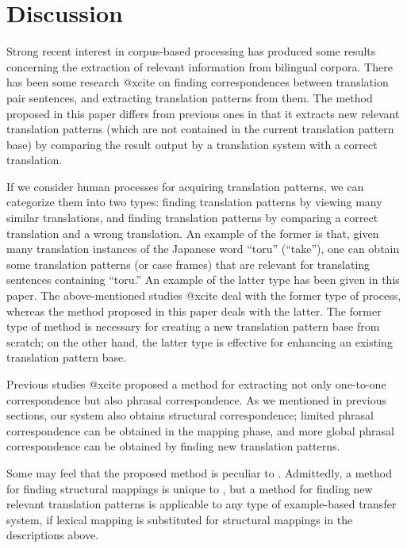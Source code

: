 \section{Discussion}


Strong recent interest in corpus-based processing has produced some results
concerning the extraction of relevant information from bilingual corpora. 
There has been some research
@xcite on finding
correspondences between translation pair sentences, and extracting translation
patterns from them.  The method proposed in this paper differs from previous
ones in that it extracts new relevant translation patterns (which are not
contained in the current translation pattern base) by comparing the result
output by a translation system with a correct translation.

If we consider human processes for acquiring translation patterns, we can
categorize them into two types: finding translation patterns by viewing many
similar translations, and finding translation patterns by comparing a correct
translation and a wrong translation.  An example of the former is that, given
many translation instances of the Japanese word ``toru'' (``take''), one can
obtain some translation patterns (or case frames) that are relevant for
translating sentences containing ``toru.'' An example of the latter type has
been given in this paper. The above-mentioned studies
@xcite deal with the former type of process, whereas the
method proposed in this paper deals with the latter.  The former type of
method is necessary for creating a new translation pattern base from
scratch; on the other hand, the latter type is effective for
enhancing an existing translation pattern base.

Previous studies @xcite proposed a method for
extracting not only one-to-one correspondence but also phrasal correspondence.
As we mentioned in previous sections, our system also obtains structural
correspondence; limited phrasal correspondence can be obtained in the mapping
phase, and more global phrasal correspondence can be obtained by finding new
translation patterns.

Some may feel that the proposed method is peculiar to \SimTran. Admittedly, a
method for finding structural mappings is unique to \SimTran, but a method for
finding new relevant translation patterns is applicable to any type of
example-based transfer system, if lexical mapping is substituted for
structural mappings in the descriptions above.

